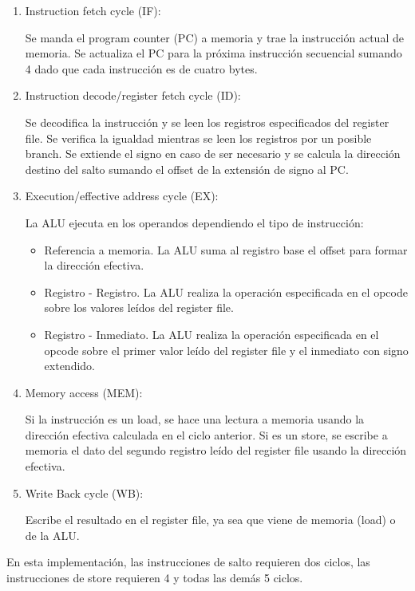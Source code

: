 \begin{enumerate}
 \item Instruction fetch cycle (IF):
 
Se manda el program counter (PC) a memoria y trae la instrucción actual de memoria. Se actualiza el PC para la próxima instrucción secuencial sumando 4 dado que cada instrucción es de cuatro bytes.

\item Instruction decode/register fetch cycle (ID):

Se decodifica la instrucción y se leen los registros especificados del register file. Se verifica la igualdad mientras se leen los registros por un posible branch. Se extiende el signo en caso de ser necesario y se calcula la dirección destino del salto sumando el offset de la extensión de signo al PC.

\item Execution/effective address cycle (EX):

La ALU ejecuta en los operandos dependiendo el tipo de instrucción:

\begin{itemize}
 \item Referencia a memoria. La ALU suma al registro base el offset para formar la dirección efectiva.
 \item Registro - Registro. La ALU realiza la operación especificada en el opcode sobre los valores leídos del register file.
 \item Registro - Inmediato. La ALU realiza la operación especificada en el opcode sobre el primer valor leído del register file y el inmediato con signo extendido.
\end{itemize}

\item Memory access (MEM):

Si la instrucción es un load, se hace una lectura a memoria usando la dirección efectiva calculada en el ciclo anterior. Si es un store, se escribe a memoria el dato del segundo registro leído del register file usando la dirección efectiva.

\item Write Back cycle (WB):

Escribe el resultado en el register file, ya sea que viene de memoria (load) o de la ALU. 
\end{enumerate}

En esta implementación, las instrucciones de salto requieren dos ciclos, las instrucciones de store requieren 4 y todas las demás 5 ciclos.


